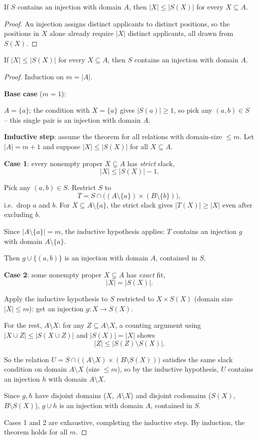 \documentclass[11pt]{article}
\begin{document}
\bigskip
\begin{theorem}
If $S$ contains an injection with domain $A$, then $|X| \le |S(X)|$ for every $X \subseteq A$.
\end{theorem}
\begin{proof}
An injection assigns distinct applicants to distinct positions, so the positions in $X$ alone already require $|X|$ distinct applicants, all drawn from $S(X)$.
\end{proof}

\bigskip
\begin{theorem}
If $|X| \le |S(X)|$ for every $X \subseteq A$, then $S$ contains an injection with domain $A$.
\end{theorem}
\begin{proof}
Induction on $m=|A|$.

\medskip
\textbf{Base case} ($m=1$):

$A=\{a\}$; the condition with $X=\{a\}$ gives $|S(a)|\ge1$, so pick any $(a,b)\in S$ -- this single pair is an injection with domain $A$.

\medskip
\textbf{Inductive step}: assume the theorem for all relations with domain-size $\le m$. Let $|A|=m+1$ and suppose $|X|\le|S(X)|$ for all $X\subseteq A$.

\medskip
\textbf{Case 1}: every nonempty proper $X\subsetneq A$ has \emph{strict} slack,
\[
|X| \le |S(X)|-1.
\]

Pick any $(a,b)\in S$. Restrict $S$ to
\[
T = S \cap \big((A\setminus\{a\})\times(B\setminus\{b\})\big),
\]
i.e.\ drop $a$ and $b$. For $X\subseteq A\setminus\{a\}$, the strict slack gives $|T(X)|\ge|X|$ even after excluding $b$.

Since $|A\setminus\{a\}|=m$, the inductive hypothesis applies: $T$ contains an injection $g$ with domain $A\setminus\{a\}$.

Then $g \cup \{(a,b)\}$ is an injection with domain $A$, contained in $S$.

\medskip
\textbf{Case 2}: some nonempty proper $X\subsetneq A$ has \emph{exact} fit,
\[
|X|=|S(X)|.
\]

Apply the inductive hypothesis to $S$ restricted to $X\times S(X)$ (domain size $|X|\le m$): get an injection $g: X \to S(X)$.

For the rest, $A\setminus X$: for any $Z\subseteq A\setminus X$, a counting argument using $|X\cup Z|\le|S(X\cup Z)|$ and $|S(X)|=|X|$ shows
\[
|Z| \le |S(Z)\setminus S(X)|.
\]

So the relation $U = S \cap \big((A\setminus X)\times(B\setminus S(X))\big)$ satisfies the same slack condition on domain $A\setminus X$ (size $\le m$), so by the inductive hypothesis, $U$ contains an injection $h$ with domain $A\setminus X$.

Since $g,h$ have disjoint domains ($X$, $A\setminus X$) and disjoint codomains ($S(X)$, $B\setminus S(X)$), $g\cup h$ is an injection with domain $A$, contained in $S$.

\medskip
Cases 1 and 2 are exhaustive, completing the inductive step. By induction, the theorem holds for all $m$.
\end{proof}
\end{document}
